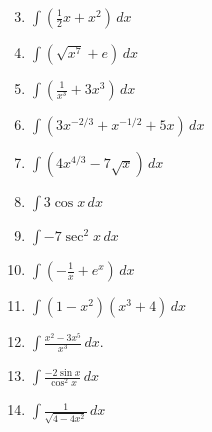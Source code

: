\documentclass[12pt]{article}
\newif\ifans
\begin{document}
\begin{enumerate}
\setcounter{enumi}{2}

\item $\int \left(\frac{1}{2}x+x^2 \right)\,dx$ 

\ifans{\fbox{$\frac{1}{4}x^2+\frac{1}{3}x^3+C$}} \fi

\item $\int \left(\sqrt{x^7}+e\right) \,dx$

\ifans{\fbox{$\frac{2}{9}x^{9/2}+ex+C$}} \fi

\item $\int \left(\frac{1}{x^3}+3x^3\right) \,dx$ 

\ifans{\fbox{$\frac{-1}{2}x^{-2}+\frac{3}{4}x^4+C$}} \fi

\item $\int \left(3x^{-2/3}+x^{-1/2} + 5x\right) \,dx$ 

\ifans{\fbox{$9x^{1/3}+2x^{1/2}+\frac{5}{2}x^2+C$}} \fi

\item $\int \left(4x^{4/3}-7\sqrt{x}\right) \,dx$ 

\ifans{\fbox{$\frac{12}{7}x^{7/3}-\frac{14}{3}x^{3/2}+C$}} \fi

\item $\int 3\cos{x} \,dx$ 

\ifans{\fbox{$3\sin{x}+C$}} \fi

\item $\int -7\sec^{2}{x} \,dx$ 

\ifans{\fbox{$-7\tan{x}+C$}} \fi

\item $\int \left(-\frac{1}{x}+ e^{x}\right) \,dx$ 

\ifans{\fbox{$-\ln{|x|}+e^{x}+C$}} \fi

\item $\int (1-x^2)(x^3+4) \,dx$ 

\ifans{\fbox{$-\frac{1}{6}x^6+\frac{1}{4}x^4-\frac{4}{3}x^3+4x+C$}} \fi

\item $\int \frac{x^2-3x^5}{x^3} \,dx$.

\ifans{\fbox{$\ln{|x|}-x^3+C$; Video Solution: \textcolor{blue}{\href{https://www.youtube.com/watch?v=JCbEFor0NYY}{https://www.youtube.com/watch?v=JCbEFor0NYY}}}} \fi

\item $\int \frac{-2\sin{x}}{\cos^{2}x} \,dx$ 

\ifans{\fbox{$-2\sec{x}+C$}} \fi

\item $\int \frac{1}{\sqrt{4-4x^2}} \,dx$ 


\end{enumerate}
\end{document}
